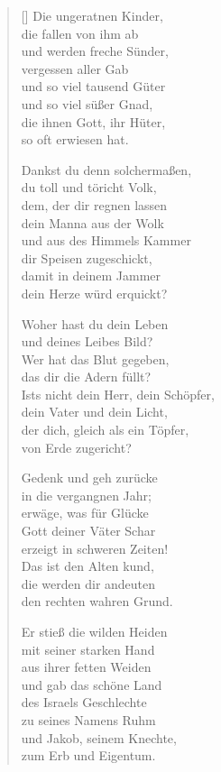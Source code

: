 \begin{multicols}{2}
\begin{verse}[\versewidth]
 Die ungeratnen Kinder,\\
die fallen von ihm ab\\
und werden freche Sünder,\\
vergessen aller Gab\\
und so viel tausend Güter\\
und so viel süßer Gnad,\\
die ihnen Gott, ihr Hüter,\\
so oft erwiesen hat.

 Dankst du denn solchermaßen,\\
du toll und töricht Volk,\\
dem, der dir regnen lassen\\
dein Manna aus der Wolk\\
und aus des Himmels Kammer\\
dir Speisen zugeschickt,\\
damit in deinem Jammer\\
dein Herze würd erquickt?

 Woher hast du dein Leben\\
und deines Leibes Bild?\\
Wer hat das Blut gegeben,\\
das dir die Adern füllt?\\
Ists nicht dein Herr, dein Schöpfer,\\
dein Vater und dein Licht,\\
der dich, gleich als ein Töpfer,\\
von Erde zugericht?

 Gedenk und geh zurücke\\
in die vergangnen Jahr;\\
erwäge, was für Glücke\\
Gott deiner Väter Schar\\
erzeigt in schweren Zeiten!\\
Das ist den Alten kund,\\
die werden dir andeuten\\
den rechten wahren Grund.

 Er stieß die wilden Heiden\\
mit seiner starken Hand\\
aus ihrer fetten Weiden\\
und gab das schöne Land\\
des Israels Geschlechte\\
zu seines Namens Ruhm\\
und Jakob, seinem Knechte,\\
zum Erb und Eigentum.


\end{verse}
\end{multicols}
